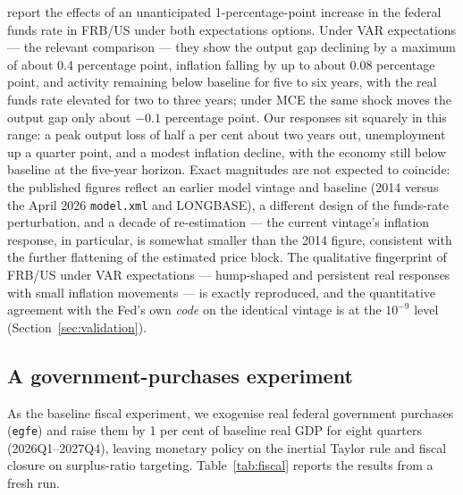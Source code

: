 \citet{brayton2014note} report the effects of an unanticipated 1-percentage-point increase in the federal funds rate in FRB/US under both expectations options. Under VAR expectations --- the relevant comparison --- they show the output gap declining by a maximum of about 0.4 percentage point, inflation falling by up to about 0.08 percentage point, and activity remaining below baseline for five to six years, with the real funds rate elevated for two to three years; under MCE the same shock moves the output gap only about $-0.1$ percentage point. Our responses sit squarely in this range: a peak output loss of half a per cent about two years out, unemployment up a quarter point, and a modest inflation decline, with the economy still below baseline at the five-year horizon. Exact magnitudes are not expected to coincide: the published figures reflect an earlier model vintage and baseline (2014 versus the April 2026 \texttt{model.xml} and LONGBASE), a different design of the funds-rate perturbation, and a decade of re-estimation --- the current vintage's inflation response, in particular, is somewhat smaller than the 2014 figure, consistent with the further flattening of the estimated price block. The qualitative fingerprint of FRB/US under VAR expectations --- hump-shaped and persistent real responses with small inflation movements --- is exactly reproduced, and the quantitative agreement with the Fed's own \emph{code} on the identical vintage is at the $10^{-9}$ level (Section~\ref{sec:validation}).

\subsection{A government-purchases experiment}
\label{sec:fiscal}

As the baseline fiscal experiment, we exogenise real federal government purchases (\texttt{egfe}) and raise them by 1 per cent of baseline real GDP for eight quarters (2026Q1--2027Q4), leaving monetary policy on the inertial Taylor rule and fiscal closure on surplus-ratio targeting. Table~\ref{tab:fiscal} reports the results from a fresh run.

